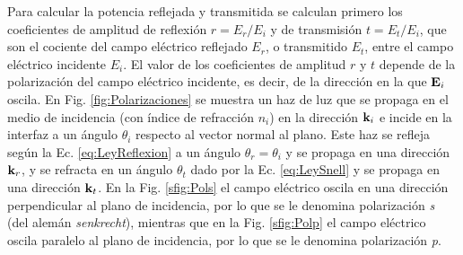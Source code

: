  Para calcular  la potencia  reflejada y transmitida  se calculan primero los coeficientes de amplitud de reflexión $r = E_r/E_i$ y de transmisión $t = E_t/E_i$, que son el cociente del campo eléctrico reflejado $E_r$, o transmitido $E_t$, entre el campo eléctrico incidente $E_i$. El valor de los coeficientes de amplitud $r$ y $t$ depende de la polarización del campo eléctrico incidente, es decir, de la dirección en la que $\vb{E}_i$ oscila.  En Fig. \ref{fig:Polarizaciones} se muestra un haz de luz que se propaga en el medio de incidencia (con índice de refracción $n_i$) en la dirección $\vb{k}_i$ e incide en la interfaz a un ángulo $\theta_i$ respecto al vector normal al plano. Este haz se refleja según la Ec. \eqref{eq:LeyReflexion} a un ángulo $\theta_r = \theta_i$ y se propaga en una dirección $\vb{k}_r$, y se refracta en un ángulo $\theta_t$ dado por la Ec. \eqref{eq:LeySnell} y se propaga en una dirección $\vb{k}_t$. En la Fig. \ref{sfig:Pols} el campo eléctrico oscila en una dirección perpendicular al plano de incidencia, por lo que se le denomina polarización \emph{s} (del alemán \emph{senkrecht}), mientras que en la Fig. \ref{sfig:Polp} el campo eléctrico oscila paralelo al plano de incidencia, por lo que se le denomina polarización \emph{p}.
%
